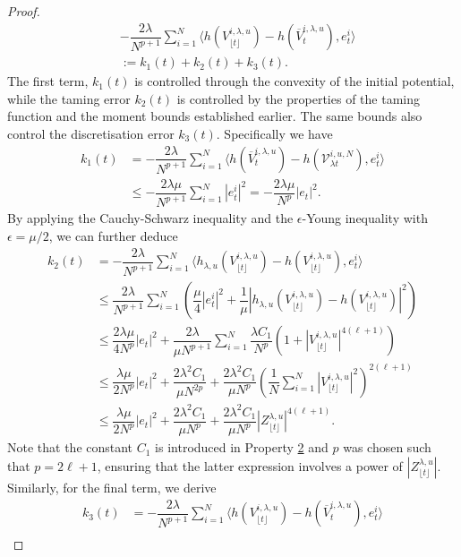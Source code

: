 \documentclass[a4paper, 10pt]{article}
\theoremstyle{plain}%
\begin{document}
\begin{proof}
\begin{align}
&-\dfrac{2\lambda}{N^{p+1}}\sum_{i=1}^N\langle  h(V_{\lfloor{t}\rfloor}^{i,\lambda,u})-h(\overline{V}_{t}^{i,\lambda,u}), e_t^i\rangle\nonumber\\
&:=k_1(t)+k_2(t)+k_3(t).\label{c1}
\end{align}
The first term, $k_1(t)$ is controlled through the convexity of the initial potential, while the taming error $k_2(t)$ is controlled by the properties of the taming function and the moment bounds established earlier. The same bounds also control the discretisation error $k_3(t)$. Specifically we have
\begin{align}
k_1(t)&=-\dfrac{2\lambda}{N^{p+1}}\sum_{i=1}^N\langle  h(\overline{V}_{t}^{i,\lambda,u})-h(\mathcal{V}_{\lambda t}^{i,u,N}), e_t^i\rangle\nonumber\\
&\leq-\dfrac{2\lambda\mu}{N^{p+1}}\sum_{i=1}^N |e_t^i|^2=-\dfrac{2\lambda\mu}{N^p}|e_t|^2\label{c2}.
\end{align}
By applying the Cauchy-Schwarz inequality and the $\epsilon$-Young inequality with $\epsilon=\mu/2$, we can further deduce
\begin{align}
k_2(t)&=-\dfrac{2\lambda}{N^{p+1}}\sum_{i=1}^N\langle  h_{\lambda,u}(V_{\lfloor{t}\rfloor}^{i,\lambda,u})-h(V_{\lfloor{t}\rfloor}^{i,\lambda,u}), e_t^i\rangle\nonumber\\
&\leq\dfrac{2\lambda}{N^{p+1}}\sum_{i=1}^N\left(\dfrac{\mu}{4}|e_t^i|^2+\dfrac{1}{\mu}|h_{\lambda,u}(V_{\lfloor{t}\rfloor}^{i,\lambda,u})-h(V_{\lfloor{t}\rfloor}^{i,\lambda,u})|^2\right)\nonumber\\
&\leq \dfrac{2\lambda\mu}{4N^p} |e_t|^2+\dfrac{2\lambda}{\mu N^{p+1}}\sum_{i=1}^N\dfrac{\lambda C_1}{N^p}(1+|V_{\lfloor{t}\rfloor}^{i,\lambda,u}|^{4(\ell+1)})\nonumber\\
&\leq \dfrac{\lambda\mu}{2N^p} |e_t|^2+\dfrac{2\lambda^2C_1}{\mu N^{2p}} +\dfrac{2\lambda^2C_1}{\mu N^p}\left(\dfrac{1}{N}\sum_{i=1}^N|V_{\lfloor{t}\rfloor}^{i,\lambda,u}|^2\right)^{2(\ell+1)}\nonumber\\&\leq\dfrac{\lambda\mu}{2N^p} |e_t|^2+\dfrac{2\lambda^2C_1}{\mu N^{p}} +\dfrac{2\lambda^2C_1}{\mu N^p}|Z_{\lfloor{t}\rfloor}^{\lambda,u}|^{4(\ell+1)}.\label{c3}
\end{align}
Note that the constant $C_1$ is introduced in Property \hyperlink{Property2}{2} and $p$ was chosen such that $p=2\ell+1$, ensuring that the latter expression involves a power of $|Z_{\lfloor{t}\rfloor}^{\lambda,u}|$. Similarly, for the final term, we derive
\begin{align*}
k_3(t)&=-\dfrac{2\lambda}{N^{p+1}}\sum_{i=1}^N\langle  h(V_{\lfloor{t}\rfloor}^{i,\lambda,u})-h(\overline{V}_{t}^{i,\lambda,u}), e_t^i\rangle\\

\end{align*}
\end{proof}
\end{document}
